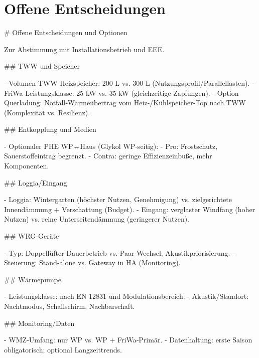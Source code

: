 \documentclass[11pt,oneside]{report}
\begin{document}
\chapter{Offene Entscheidungen}
\begin{markdown}
# Offene Entscheidungen und Optionen

Zur Abstimmung mit Installationsbetrieb und EEE.

## TWW und Speicher

- Volumen TWW‑Heizspeicher: 200 L vs. 300 L (Nutzungsprofil/Parallellasten).
- FriWa‑Leistungsklasse: 25 kW vs. 35 kW (gleichzeitige Zapfungen).
- Option Querladung: Notfall‑Wärmeübertrag vom Heiz-/Kühlspeicher‑Top nach TWW (Komplexität vs. Resilienz).

## Entkopplung und Medien

- Optionaler PHE WP↔Haus (Glykol WP‑seitig):
  - Pro: Frostschutz, Sauerstoffeintrag begrenzt.
  - Contra: geringe Effizienzeinbuße, mehr Komponenten.

## Loggia/Eingang

- Loggia: Wintergarten (höchster Nutzen, Genehmigung) vs. zielgerichtete Innendämmung + Verschattung (Budget).
- Eingang: verglaster Windfang (hoher Nutzen) vs. reine Unterseitendämmung (geringerer Nutzen).

## WRG‑Geräte

- Typ: Doppellüfter‑Dauerbetrieb vs. Paar‑Wechsel; Akustikpriorisierung.
- Steuerung: Stand‑alone vs. Gateway in HA (Monitoring).

## Wärmepumpe

- Leistungsklasse: nach EN 12831 und Modulationsbereich.
- Akustik/Standort: Nachtmodus, Schallschirm, Nachbarschaft.

## Monitoring/Daten

- WMZ‑Umfang: nur WP vs. WP + FriWa‑Primär.
- Datenhaltung: erste Saison obligatorisch; optional Langzeittrends.
\end{markdown}
\end{document}
